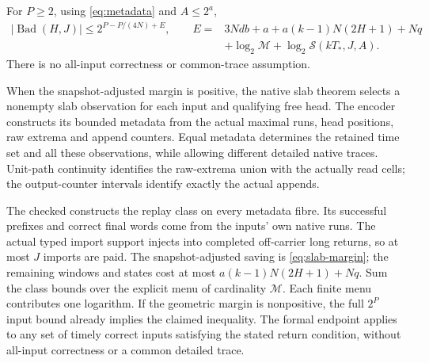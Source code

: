 \begin{theorem}\label{thm:finite-returns}
For $P\ge2$, using \cref{eq:metadata} and $A\le2^a$,
\begin{align}\label{eq:finite-returns}
 |\operatorname{Bad}(H,J)|\le
 2^{P-P/(4N)+E},\qquad
 E={}&3Ndb+a+a(k-1)N(2H+1)+Nq\\
 &+\log_2\mathcal M+\log_2\mathcal S(kT_*,J,A).\nonumber
\end{align}
There is no all-input correctness or common-trace assumption.
\end{theorem}
\begin{outline}
When the snapshot-adjusted margin is positive, the native slab theorem
selects a nonempty slab observation for each input and qualifying free head.
The encoder constructs its bounded metadata from the actual maximal runs,
head positions, raw extrema and append counters. Equal metadata determines
the retained time set and all these observations, while allowing different
detailed native traces. Unit-path continuity identifies the raw-extrema
union with the actually read cells; the output-counter intervals identify
exactly the actual appends.

The checked  constructs the replay class on every
metadata fibre. Its successful prefixes and correct final words come from
the inputs' own native runs. The actual typed import support injects into
completed off-carrier long returns, so at most $J$ imports are paid.
The snapshot-adjusted saving is \cref{eq:slab-margin}; the remaining windows
and states cost at most $a(k-1)N(2H+1)+Nq$. Sum the class bounds over the
explicit menu of cardinality $\mathcal M$. Each finite menu contributes one
logarithm. If the geometric margin is nonpositive, the full $2^P$ input
bound already implies the claimed inequality. The formal endpoint applies
to any set of timely correct inputs satisfying the stated return condition,
without all-input correctness or a common detailed trace.
\end{outline}


